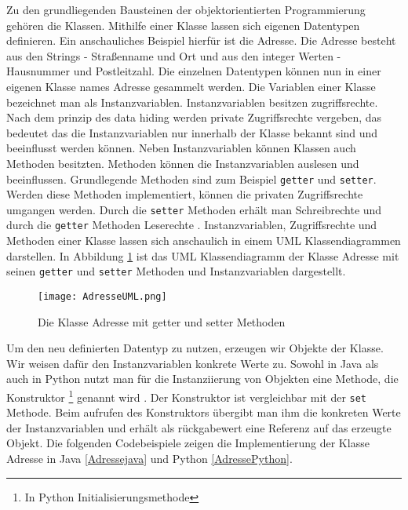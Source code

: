 Zu den grundliegenden Bausteinen der objektorientierten Programmierung gehören die Klassen. Mithilfe einer Klasse lassen sich eigenen Datentypen definieren. Ein anschauliches Beispiel hierfür ist die Adresse. Die Adresse besteht aus den Strings - Straßenname und Ort und aus den integer Werten - Hausnummer und Postleitzahl. Die einzelnen Datentypen können nun in einer eigenen Klasse names Adresse gesammelt werden. Die Variablen einer Klasse bezeichnet man als Instanzvariablen. 
Instanzvariablen besitzen zugriffsrechte. Nach dem prinzip des data hiding werden private Zugriffsrechte vergeben, das bedeutet das die Instanzvariablen nur innerhalb der Klasse bekannt sind und beeinflusst werden können.
Neben Instanzvariablen können Klassen auch Methoden besitzten. Methoden können die Instanzvariablen auslesen und beeinflussen. Grundlegende Methoden sind zum Beispiel \texttt{getter} und \texttt{setter}. Werden diese Methoden implementiert, können die privaten Zugriffsrechte umgangen werden. Durch die \texttt{setter} Methoden erhält man Schreibrechte und durch die \texttt{getter} Methoden Leserechte \cite{JavaRatz}.
Instanzvariablen, Zugriffsrechte und Methoden einer Klasse lassen sich anschaulich in einem UML Klassendiagrammen darstellen. In Abbildung \ref{img:AdresseUML} ist das UML Klassendiagramm der Klasse Adresse mit seinen \texttt{getter} und \texttt{setter} Methoden und Instanzvariablen dargestellt. 

\begin{figure}[!htb]
    \centering
    \texttt{[image: AdresseUML.png]}
    \caption{Die Klasse Adresse mit getter und setter Methoden}
    \label{img:AdresseUML}
\end{figure}

Um den neu definierten Datentyp zu nutzen, erzeugen wir Objekte der Klasse. Wir weisen dafür den Instanzvariablen konkrete Werte zu. Sowohl in Java als auch in Python nutzt man für die Instanziierung von Objekten eine Methode, die Konstruktor \footnote{In Python  Initialisierungsmethode} genannt wird . Der Konstruktor ist vergleichbar mit der \texttt{set} Methode. Beim aufrufen des Konstruktors übergibt man ihm die konkreten Werte der Instanzvariablen und erhält als rückgabewert eine Referenz auf das erzeugte Objekt. Die folgenden Codebeispiele zeigen die Implementierung der Klasse Adresse in Java \ref{Adressejava} und Python \ref{AdressePython}.

